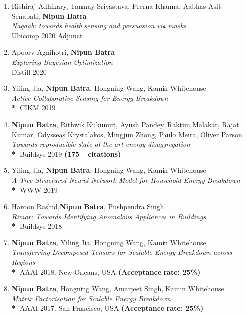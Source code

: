 \documentclass[letter,10pt]{article}
\begin{document}
\begin{itemize}
\begin{enumerate}
    \item{Rishiraj Adhikary, Tanmay Srivastava, Prerna Khanna, Aabhas Asit Senapati, \textbf{Nipun Batra}}\\
    \textit{Naqaab: towards health sensing and persuasion via masks}\\
    {Ubicomp 2020 Adjunct}
    
    \item{Apoorv Agnihotri, \textbf{Nipun Batra}}\\
    \textit{Exploring Bayesian Optimization}\\
    \textbf{}{Distill 2020}

    \item{Yiling Jia, \textbf{Nipun Batra}, Hongning Wang, Kamin Whitehouse}\\
    \textit{Active Collaborative Sensing for Energy Breakdown}\\
    \textbf{*~}{CIKM 2019}
     
    \item{\textbf{Nipun Batra}, Rithwik Kukunuri, Ayush Pandey, Raktim Malakar, Rajat Kumar, Odysseas Krystalakos, Mingjun Zhong, Paulo Meira, Oliver Parson}\\
    \textit{Towards reproducible state-of-the-art energy disaggregation}\\
    \textbf{*~}{Buildsys 2019 \textbf{(175+ citations)}}
     
     
     \item
            {Yiling Jia, \textbf{Nipun Batra}, Hongning Wang, Kamin Whitehouse}\\
         	\textit{A Tree-Structured Neural Network Model for Household Energy Breakdown
}\\
	       \textbf{*~}{WWW 2019}
            \item
            {Haroon Rashid,\textbf{Nipun Batra}, Pushpendra Singh}\\
         	\textit{Rimor: Towards Identifying Anomalous Appliances in Buildings}\\
	       \textbf{*~}{Buildsys 2018}
        \item
            {\textbf{Nipun Batra}, Yiling Jia, Hongning Wang, Kamin Whitehouse}\\
         	\textit{Transferring Decomposed Tensors for Scalable Energy Breakdown across Regions}\\
	       \textbf{*~}{AAAI 2018. New Orleans, USA \textbf{(Acceptance rate: 25\%)}}
	   \item 
	   	{\textbf{Nipun Batra}, Hongning Wang, Amarjeet Singh, Kamin Whitehouse} \\\textit{Matrix Factorisation for Scalable Energy Breakdown}\\
	 \textbf{*~}{AAAI 2017. San Francisco, USA \textbf{(Acceptance rate: 25\%)}}


\end{enumerate}
\end{itemize}
\end{document}

